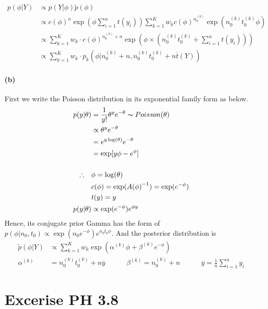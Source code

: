 \documentclass[11pt, letterpaper]{article}
\begin{document}
\begin{align*}
  p(\phi|Y) &\propto p(Y|\phi)\tilde{p}(\phi) \\
    &\propto {c(\phi)}^{n} \exp(\phi \sum_{i=1}^{n} t(y_i)) \sum_{k=1}^{K} w_k {c(\phi)}^{n_0^{(k)}} \exp(n_0^{(k)} t_0^{(k)} \phi) \\
    &\propto \sum_{k=1}^{K} w_k \cdot {c(\phi)}^{n_0^{(k)} + n} \exp(\phi \times (n_0^{(k)} t_0^{(k)} + \sum_{i=1}^{n} t(y_i))) \\
    &\propto \sum_{k=1}^{K} w_k \cdot p_k(\phi | n_0^{(k)}+n, n_0^{(k)} t_0^{(k)} + n \overline{t}(Y))
\end{align*}

\paragraph{(b)}
First we write the Poisson distribution in its exponential family form as below.
\begin{align*}
  p(y|\theta) &= \frac{1}{y!} \theta^y e^{-\theta} \thicksim Poisson(\theta) \\
    &\propto \theta^y e^{-\theta} \\
    &= e^{y \log(\theta)} e^{-\theta} \\
    &= \exp[y\phi - e^{\phi}] \\ \\
  \therefore \quad & \phi = \log(\theta) \\
    & c(\phi) = \exp({A(\phi)}^{-1}) = \exp(e^{-\phi}) \\
    & t(y) = y \\
  p(y|\theta) &\propto \exp(e^{-\phi}) e^{\phi y}
\end{align*}
Hence, its conjugate prior Gamma has the form of $p(\phi|n_0, t_0) \propto \exp(n_0 e^{-\phi}) e^{n_0 t_0 \phi}$.
And the posterior distribution is
\begin{align*}
  \tilde{p}(\phi|Y) &\propto \sum_{k=1}^{K} w_k \exp(\alpha^{(k)} \phi + \beta^{(k)} e^{-\phi}) \\
    \alpha^{(k)} &= n_0^{(k)} t_0^{(k)} + n\overline{y} \qquad\quad \beta^{(k)} = n_0^{(k)} + n \qquad\quad \overline{y} = \frac{1}{n} \sum_{i=1}^{n} y_i
\end{align*}
\newpage


\section{Excerise PH 3.8}

\newpage
\end{document}
